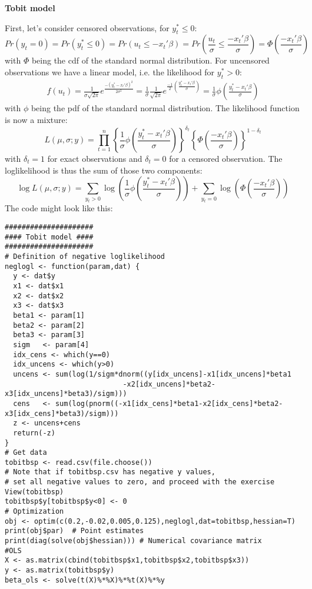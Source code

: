 \begin{Solution}{12.5}
\textbf{Tobit model}

First, let's consider censored observations, for $y_t^*\leq 0$:
\begin{equation*}
  Pr(y_t = 0) = Pr(y_t^* \leq 0) = Pr(u_t\leq -x_t'\beta) = Pr\left(\frac{u_t}{\sigma}\leq \frac{-x_t'\beta}{\sigma}\right) = \Phi\left(\frac{-x_t'\beta}{\sigma}\right)
\end{equation*}
with $\Phi$ being the cdf of the standard normal distribution. For uncensored observations we have a linear model, i.e. the likelihood for $y_t^*> 0$:
\begin{align*}
  f(u_t) = \frac{1}{\sigma\sqrt{2\pi}}e^{\frac{-(y_t^*-x_t'\beta)^2}{2\sigma^2}} = \frac{1}{\sigma} \frac{1}{\sqrt{2\pi}}e^{\frac{-1}{2}\left(\frac{y_t^*-x_t'\beta}{\sigma}\right)} = \frac{1}{\sigma}\phi\left(\frac{y_t^*-x_t'\beta}{\sigma}\right)
\end{align*}
with $\phi$ being the pdf of the standard normal distribution. The likelihood function is now a mixture:
\begin{equation*}
L(\mu,\sigma; y) = \prod_{t=1}^n\left\{ \frac{1}{\sigma}\phi\left(\frac{y_t^*-x_t'\beta}{\sigma}\right)\right\}^{\delta_t}
\left\{\Phi\left(\frac{-x_t'\beta}{\sigma}\right)\right\}^{1-\delta_t}
\end{equation*}
with $\delta_t=1$ for exact observations and $\delta_t=0$ for a censored observation. The loglikelihood is thus the sum of those two components:
\begin{equation*}
\log L(\mu,\sigma; y) = \sum_{y_t>0} \log\left(\frac{1}{\sigma}\phi\left(\frac{y_t^*-x_t'\beta}{\sigma}\right)\right) +
\sum_{y_t=0} \log\left(\Phi\left(\frac{-x_t'\beta}{\sigma}\right)\right)
\end{equation*}
The code might look like this:
\begin{verbatim}
#####################
#### Tobit model ####
#####################
# Definition of negative loglikelihood
neglogl <- function(param,dat) {
  y <- dat$y
  x1 <- dat$x1
  x2 <- dat$x2
  x3 <- dat$x3
  beta1 <- param[1]
  beta2 <- param[2]
  beta3 <- param[3]
  sigm   <- param[4]
  idx_cens <- which(y==0)
  idx_uncens <- which(y>0)
  uncens <- sum(log(1/sigm*dnorm((y[idx_uncens]-x1[idx_uncens]*beta1
                            -x2[idx_uncens]*beta2-x3[idx_uncens]*beta3)/sigm)))
  cens   <- sum(log(pnorm((-x1[idx_cens]*beta1-x2[idx_cens]*beta2-x3[idx_cens]*beta3)/sigm)))
  z <- uncens+cens
  return(-z)
}
# Get data
tobitbsp <- read.csv(file.choose())
# Note that if tobitbsp.csv has negative y values,
# set all negative values to zero, and proceed with the exercise
View(tobitbsp)
tobitbsp$y[tobitbsp$y<0] <- 0
# Optimization
obj <- optim(c(0.2,-0.02,0.005,0.125),neglogl,dat=tobitbsp,hessian=T)
print(obj$par)  # Point estimates
print(diag(solve(obj$hessian))) # Numerical covariance matrix
#OLS
X <- as.matrix(cbind(tobitbsp$x1,tobitbsp$x2,tobitbsp$x3))
y <- as.matrix(tobitbsp$y)
beta_ols <- solve(t(X)%*%X)%*%t(X)%*%y
\end{verbatim}


\end{Solution}
